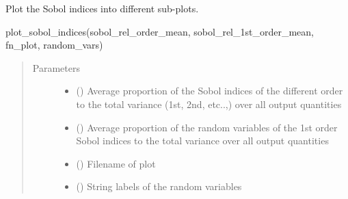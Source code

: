 \documentclass[letterpaper,10pt,english,openany,oneside]{sphinxmanual}
\begin{document}
\begin{fulllineitems}
\label{\detokenize{pygpc:pygpc.Visualization.plot_sobol_indices}}
Plot the Sobol indices into different sub-plots.

plot\_sobol\_indices(sobol\_rel\_order\_mean, sobol\_rel\_1st\_order\_mean, fn\_plot, random\_vars)
\begin{quote}\begin{description}
\item[{Parameters}] \leavevmode\begin{itemize}
\item {} 
 (\sphinxstyleliteralemphasis{\sphinxupquote{ {[}}}\sphinxstyleliteralemphasis{\sphinxupquote{{]}}}) \textendash{} Average proportion of the Sobol indices of the different order to the total variance (1st, 2nd, etc..,)
over all output quantities

\item {} 
 (\sphinxstyleliteralemphasis{\sphinxupquote{ {[}}}\sphinxstyleliteralemphasis{\sphinxupquote{{]}}}) \textendash{} Average proportion of the random variables of the 1st order Sobol indices to the total variance over all
output quantities

\item {} 
 () \textendash{} Filename of plot

\item {} 
 (\sphinxstyleliteralemphasis{\sphinxupquote{{[}}}\sphinxstyleliteralemphasis{\sphinxupquote{{]} }}) \textendash{} String labels of the random variables

\end{itemize}

\end{description}\end{quote}

\end{fulllineitems}
\end{document}
